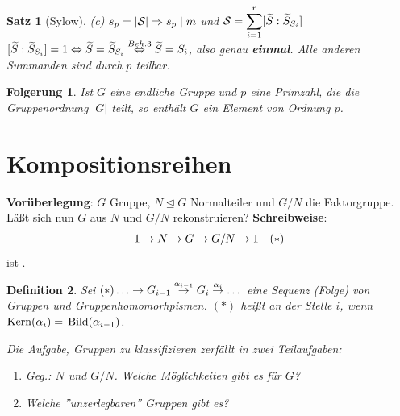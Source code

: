 \documentclass[a4paper,10pt,german]{scrbook}
\theoremstyle{saetze}
\newtheorem{Satz}{Satz}
\theoremstyle{definitionen}
\newtheorem{Def}{Definition}[section]
\newtheorem{Folg}[Def]{Folgerung}
\begin{document}
\begin{Satz}[Sylow]
{    \item[(c)] $s_p = |\mathcal{S}| \Rightarrow s_p \mid m$ und $\mathcal{S} =
    \displaystyle \sum_{i=1}^r [\widetilde{S}: \widetilde{S}_{S_i}]\\$
    $[\widetilde{ S}:\widetilde{S}_{S_i}] = 1 \Leftrightarrow \widetilde{S} =
    \widetilde{S}_{S_i} \overset{Beh.3}{\Leftrightarrow} \widetilde{S} = S_i$, also genau
    \textbf{einmal}. Alle anderen Summanden sind durch $p$ teilbar.}
\end{Satz}

\begin{Folg}
Ist $G$ eine endliche Gruppe und $p$ eine
Primzahl, die die Gruppenordnung $|G|$ teilt, so enthält $G$ ein Element
von Ordnung $p$.


\end{Folg}

\section{Kompositionsreihen}

\textbf{Vorüberlegung}: $G$ Gruppe, $N
\trianglelefteq G$ Normalteiler und $G/N$ die Faktorgruppe.
\newline Läßt sich nun $G$ aus $N$ und $G/N$
rekonstruieren? \smallskip
\newline \textbf{Schreibweise}: \[\begin{array}{lr}1 \rightarrow N \rightarrow G \rightarrow G/N \rightarrow 1 & (\ast) \end{array}\] ist
.

\begin{Def}
Sei $(\ast) \dots \ra G_{i-1}
\overset{\alpha_{i-1}}{\ra} G_i \overset{\alpha_i}{\ra} \dots$ eine
Sequenz (Folge) von Gruppen und Gruppenhomomorhpismen.
\newline $(\ast)$ heißt  an der Stelle $i$, wenn
$\mathop{\rm Kern}\nolimits(\alpha_i) =$ $\mathop{\rm Bild}\nolimits(\alpha_{i-1})$. \smallskip\newline {}

Die Aufgabe, Gruppen zu klassifizieren zerfällt in zwei
Teilaufgaben:
\begin{enumerate}
\renewcommand{\labelenumi}{(\theenumi)}
\item Geg.: $N$ und $G/N$. Welche Möglichkeiten gibt es für $G$?
\item Welche ''unzerlegbaren'' Gruppen gibt es?
\end{enumerate}
\end{Def}
\end{document}
